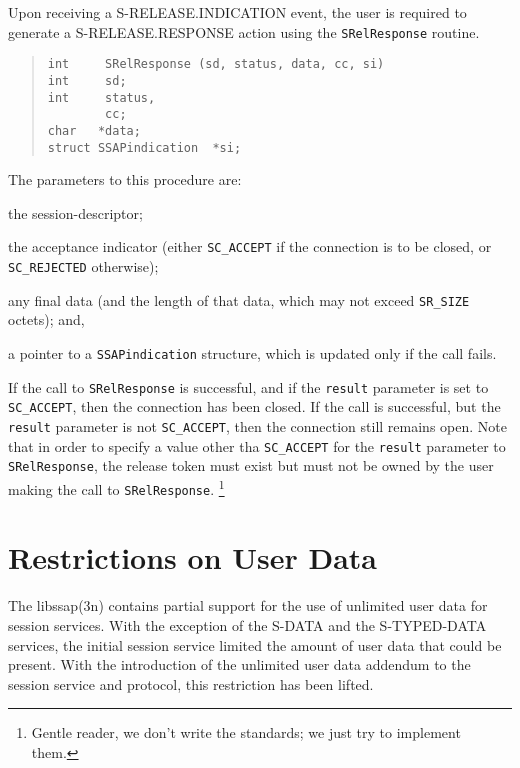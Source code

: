 Upon receiving a {\sf S-RELEASE.INDICATION\/} event,
the user is required to generate a {\sf S-RELEASE.RESPONSE\/} action
using the \verb"SRelResponse" routine.
\begin{quote}\small\begin{verbatim}
int     SRelResponse (sd, status, data, cc, si)
int     sd;
int     status,
        cc;
char   *data;
struct SSAPindication  *si;
\end{verbatim}\end{quote}
The parameters to this procedure are:
\begin{describe}
\item[\verb"sd":] the session-descriptor;

\item[\verb"status":] the acceptance indicator
(either \verb"SC_ACCEPT" if the connection is to be closed,
or \verb"SC_REJECTED" otherwise);

\item[\verb"data"/\verb"cc":] any final data (and the length of that data,
which may not exceed \verb"SR_SIZE" octets);
and,

\item[\verb"si":] a pointer to a \verb"SSAPindication" structure, which is
updated only if the call fails.
\end{describe}
If the call to \verb"SRelResponse" is successful,
and if the \verb"result" parameter is set to \verb"SC_ACCEPT",
then the connection has been closed.
If the call is successful,
but the \verb"result" parameter is not \verb"SC_ACCEPT",
then the connection still remains open.
Note that in order to specify a value other tha \verb"SC_ACCEPT" for the
\verb"result" parameter to \verb"SRelResponse",
the release token must exist but must not be owned by the user making the
call to \verb"SRelResponse".%
\footnote{Gentle reader, we don't write the standards;
we just try to implement them.}

\section	{Restrictions on User Data}
The \man libssap(3n) contains partial support for the use of unlimited user
data for session services.
With the exception of the {\sf S-DATA\/} and the {\sf S-TYPED-DATA\/} services,
the initial session service limited the amount of user data that could be
present. 
With the introduction of the unlimited user data
addendum\cite{ISO.SS.UserData,ISO.SP.UserData} to the session service and
protocol,
this restriction has been lifted.

